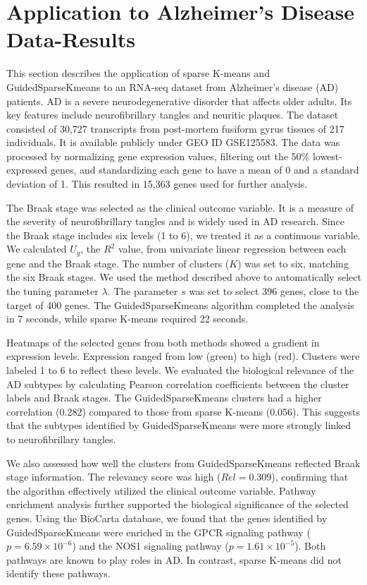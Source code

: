\documentclass{statsoc}
\begin{document}
\section{Application to Alzheimer’s Disease Data-Results}

This section describes the application of sparse K-means and GuidedSparseKmeans to an RNA-seq dataset from Alzheimer’s disease (AD) patients. AD is a severe neurodegenerative disorder that affects older adults. Its key features include neurofibrillary tangles and neuritic plaques. The dataset consisted of 30,727 transcripts from post-mortem fusiform gyrus tissues of 217 individuals. It is available publicly under GEO ID GSE125583. The data was processed by normalizing gene expression values, filtering out the 50\% lowest-expressed genes, and standardizing each gene to have a mean of 0 and a standard deviation of 1. This resulted in 15,363 genes used for further analysis.

The Braak stage was selected as the clinical outcome variable. It is a measure of the severity of neurofibrillary tangles and is widely used in AD research. Since the Braak stage includes six levels (1 to 6), we treated it as a continuous variable. We calculated $U_g$, the $R^2$ value, from univariate linear regression between each gene and the Braak stage. The number of clusters ($K$) was set to six, matching the six Braak stages. We used the method described above to automatically select the tuning parameter $\lambda$. The parameter $s$ was set to select 396 genes, close to the target of 400 genes. The GuidedSparseKmeans algorithm completed the analysis in 7 seconds, while sparse K-means required 22 seconds.

Heatmaps of the selected genes from both methods showed a gradient in expression levels. Expression ranged from low (green) to high (red). Clusters were labeled 1 to 6 to reflect these levels. We evaluated the biological relevance of the AD subtypes by calculating Pearson correlation coefficients between the cluster labels and Braak stages. The GuidedSparseKmeans clusters had a higher correlation (0.282) compared to those from sparse K-means (0.056). This suggests that the subtypes identified by GuidedSparseKmeans were more strongly linked to neurofibrillary tangles.

We also assessed how well the clusters from GuidedSparseKmeans reflected Braak stage information. The relevancy score was high ($Rel = 0.309$), confirming that the algorithm effectively utilized the clinical outcome variable. Pathway enrichment analysis further supported the biological significance of the selected genes. Using the BioCarta database, we found that the genes identified by GuidedSparseKmeans were enriched in the GPCR signaling pathway ($p = 6.59 \times 10^{-6}$) and the NOS1 signaling pathway ($p = 1.61 \times 10^{-5}$). Both pathways are known to play roles in AD. In contrast, sparse K-means did not identify these pathways.
\end{document}
